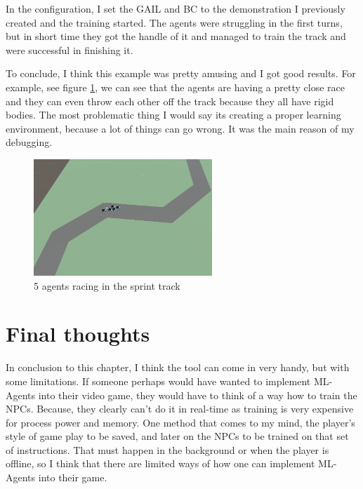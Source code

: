 \documentclass[a4paper, 12pt]{book}
\begin{document}
In the configuration, I set the GAIL and BC to the demonstration I previously created and the training started. The agents were struggling in the first turns, but in short time they got the handle of it and managed to train the track and were successful in finishing it.

To conclude, I think this example was pretty amusing and I got good results. For example, see figure \ref{Sprintracing}, we can see that  the agents are having a pretty close race and they can even throw each other off the track because they all have rigid bodies. The most problematic thing I would say its creating a proper learning environment, because a lot of things can go wrong. It was the main reason of my debugging.

\begin{figure}[h]
\begin{center}
\includegraphics[width=0.6\textwidth]{Images/SprintRacing.png}
\end{center}
\caption{5 agents racing in the sprint track}
\label{Sprintracing}
\end{figure}

\section{Final thoughts}

In conclusion to this chapter, I think the tool can come in very handy, but with some limitations. If someone perhaps would have wanted to implement ML-Agents into their video game, they would have to think of a way how to train the NPCs. Because, they clearly can't do it in real-time as training is very expensive for process power and memory. One method that comes to my mind, the player's style of game play to be saved, and later on the NPCs to be trained on that set of instructions. That must happen in the background or when the player is offline, so I think that there are limited ways of how one can implement ML-Agents \cite{MLAgents} into their game.
\end{document}
